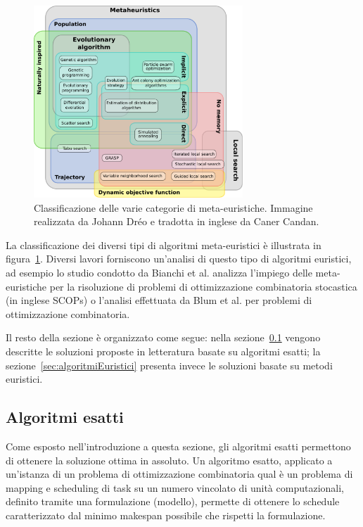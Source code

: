 \begin{figure}[t!]
 \begin{center}
  \includegraphics[width=0.7\textwidth]
  {capitoli/figure/cap3/MetaheuristicsClassification.pdf}
  \caption[Classificazione degli algoritmi meta-euristici]{Classificazione delle
  varie categorie di meta-euristiche. Immagine 
realizzata da Johann Dréo \cite{MetaheuristicsClassifications} e tradotta in inglese da Caner Candan.}
\label{fig:metaheuristicsClassification}
 \end{center}
\end{figure}


La classificazione dei diversi tipi di algoritmi meta-euristici è illustrata in 
figura~\ref{fig:metaheuristicsClassification}. Diversi lavori forniscono 
un'analisi di questo tipo di algoritmi euristici, ad esempio lo studio condotto 
da Bianchi et al. \cite{SurveyMetaheuristicSCOP} analizza l'impiego delle 
meta-euristiche per la risoluzione di problemi di ottimizzazione combinatoria stocastica
(in inglese \aclp{SCOP}) o l'analisi effettuata da Blum 
et al. \cite{MetaheuristicCombinatorialOptimization} per problemi di 
ottimizzazione combinatoria.

Il resto della sezione è organizzato come segue: nella
sezione~\ref{sec:algoritmiEsatti} vengono descritte le soluzioni proposte in letteratura 
basate su algoritmi esatti; la
sezione~\ref{sec:algoritmiEuristici} presenta invece le soluzioni basate su metodi 
euristici.


\subsection{Algoritmi esatti}
\label{sec:algoritmiEsatti}
Come esposto nell'introduzione a questa sezione, gli algoritmi esatti 
permettono di ottenere la soluzione ottima in assoluto. Un algoritmo esatto, 
applicato a un'istanza di un problema di ottimizzazione combinatoria qual è un
problema di mapping e scheduling di task su un numero vincolato di unit\`a computazionali,
definito tramite una formulazione (modello), permette di ottenere lo schedule
caratterizzato dal minimo makespan possibile che rispetti la formulazione. 

